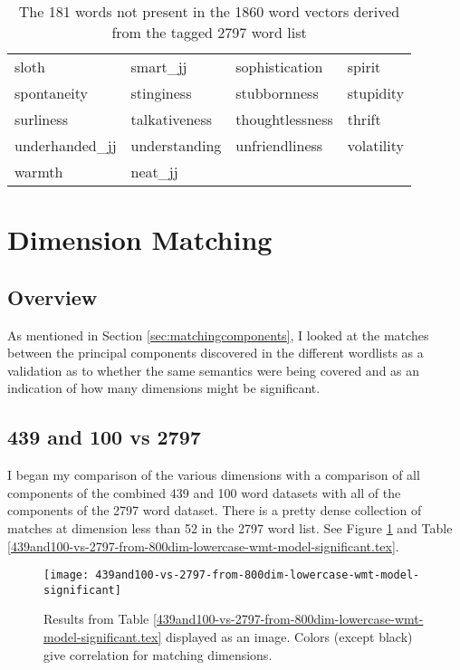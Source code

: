 \begin{table}[tbp]
\begin{tabular}{| llll |}
        sloth & smart\_jj & sophistication & spirit \\
        spontaneity & stinginess & stubbornness & stupidity \\
        surliness & talkativeness & thoughtlessness & thrift \\
        underhanded\_jj & understanding & unfriendliness & volatility \\
        warmth & neat\_jj &  &  \\
        \hline
    \end{tabular}
    \caption{The 181 words not present in the 1860 word vectors derived from
    the tagged 2797 word list}
    \label{tab:additionalwordsin2797combined}

\end{table}



\section{Dimension Matching}
\label{sec:dimensionmapping}
\subsection{Overview}

As mentioned in Section \ref{sec:matchingcomponents}, I looked at the
matches between the principal components discovered in the different
wordlists as a validation as to whether the same semantics were being
covered and as an indication of how many dimensions might be
significant.

\subsection{439 and 100 vs 2797}

I began my comparison of the various dimensions with a comparison of all 
components of the combined 439 and 100 word datasets with all of the components
of the 2797 word dataset. There is a pretty dense collection of matches at
dimension less than 52 in the 2797 word list. See Figure 
\ref{fig:439and100vs2797} and Table
\ref{439and100-vs-2797-from-800dim-lowercase-wmt-model-significant.tex}. 



\begin{figure}[tbp]
    \texttt{[image: 439and100-vs-2797-from-800dim-lowercase-wmt-model-significant]}
    \caption{Results from Table 
    \ref{439and100-vs-2797-from-800dim-lowercase-wmt-model-significant.tex} 
    displayed as an image. Colors (except black) give correlation for matching 
    dimensions.}
    \label{fig:439and100vs2797}
\end{figure}

